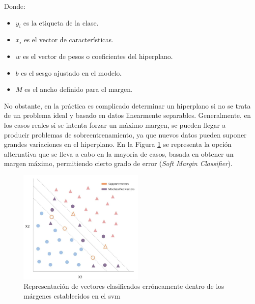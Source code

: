    Donde:
\begin{itemize}
    \renewcommand{\labelitemi}{}
    \item \(y_i\) es la etiqueta de la clase. 
    \item \(x_i\) es el vector de características.
    \item \(w\) es el vector de pesos o coeficientes del hiperplano.
    \item \(b\) es el sesgo ajustado en el modelo.
    \item \(M\) es el ancho definido para el margen.
\end{itemize}

\vspace{3mm}

No obstante, en la práctica es complicado determinar un hiperplano si no se trata de un problema ideal y basado en datos linearmente separables. Generalmente, en los casos reales si se intenta forzar un máximo margen, se pueden llegar a producir problemas de sobreentrenamiento, ya que nuevos datos pueden suponer grandes variaciones en el hiperplano. En la Figura \ref{fig:svmerror} se representa la opción alternativa que se lleva a cabo en la mayoría de casos, basada en obtener un margen máximo, permitiendo cierto grado de error (\textit{Soft Margin Classifier}). \cite{matlab} \cite{svmciencia}

\vspace{3mm}

\begin{figure}[h!]
    \centering
    \includegraphics[width=0.55\textwidth]{img/teoria/svm2.png}
    \caption{Representación de vectores clasificados erróneamente dentro de los márgenes establecidos en el \acrshort{svm} \cite{svmmedium}}
    \label{fig:svmerror}
\end{figure}

\vspace{3mm}

